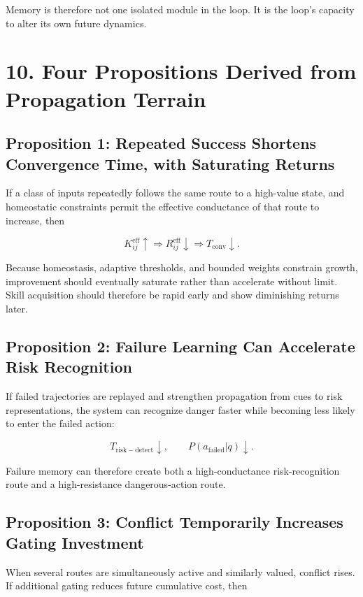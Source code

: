 \documentclass[11pt, a4paper]{article}
\begin{document}
Memory is therefore not one isolated module in the loop. It is the loop's capacity to alter its own future dynamics.


\section{10. Four Propositions Derived from Propagation Terrain}

\subsection{Proposition 1: Repeated Success Shortens Convergence Time, with Saturating Returns}

If a class of inputs repeatedly follows the same route to a high-value state, and homeostatic constraints permit the effective conductance of that route to increase, then

\[
K_{ij}^{\mathrm{eff}}\uparrow
\Rightarrow R_{ij}^{\mathrm{eff}}\downarrow
\Rightarrow T_{\mathrm{conv}}\downarrow.
\]

Because homeostasis, adaptive thresholds, and bounded weights constrain growth, improvement should eventually saturate rather than accelerate without limit. Skill acquisition should therefore be rapid early and show diminishing returns later.

\subsection{Proposition 2: Failure Learning Can Accelerate Risk Recognition}

If failed trajectories are replayed and strengthen propagation from cues to risk representations, the system can recognize danger faster while becoming less likely to enter the failed action:

\[
T_{\mathrm{risk-detect}}\downarrow,\qquad P(a_{\mathrm{failed}}|q)\downarrow.
\]

Failure memory can therefore create both a high-conductance risk-recognition route and a high-resistance dangerous-action route.

\subsection{Proposition 3: Conflict Temporarily Increases Gating Investment}

When several routes are simultaneously active and similarly valued, conflict rises. If additional gating reduces future cumulative cost, then
\end{document}
